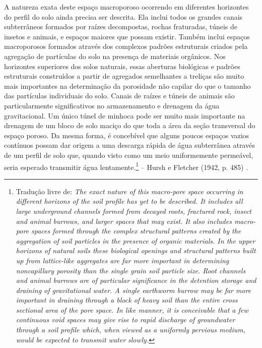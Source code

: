 \documentclass[./main.tex]{subfiles}
\begin{document}
\begin{adjustwidth}{100pt}{0pt}
\medskip
\small A natureza exata deste espaço macroporoso ocorrendo em diferentes horizontes do perfil do solo ainda precisa ser descrita. Ela inclui todos os grandes canais subterrâneos formados por raízes decompostas, rochas fraturadas, túneis de insetos e animais, e espaços maiores que possam existir. Também inclui espaços macroporosos formados através dos complexos padrões estruturais criados pela agregação de partículas do solo na presença de materiais orgânicos. Nos horizontes superiores dos solos naturais, essas aberturas biológicas e padrões estruturais construídos a partir de agregados semelhantes a treliças são muito mais importantes na determinação da porosidade não capilar do que o tamanho das partículas individuais do solo. Canais de raízes e túneis de animais são particularmente significativos no armazenamento e drenagem da água gravitacional. Um único túnel de minhoca pode ser muito mais importante na drenagem de um bloco de solo maciço do que toda a área da seção transversal do espaço poroso. Da mesma forma, é concebível que alguns poucos espaços vazios contínuos possam dar origem a uma descarga rápida de água subterrânea através de um perfil de solo que, quando visto como um meio uniformemente permeável, seria esperado transmitir água lentamente.\footnote{Tradução livre de: \textit{The exact nature of this macro-pore space occurring in different horizons of the soil profile has yet to be described. It includes all large underground channels formed from decayed roots, fractured rock, insect and animal burrows, and larger spaces that may exist. It also includes macro-pore spaces formed through the complex structural patterns created by the aggregation of soil particles in the presence of organic materials. In the upper horizons of natural soils these biological openings and structural patterns built up from lattice-like aggregates are far more important in determining noncapillary porosity than the single grain soil particle size. Root channels and animal burrows are of particular significance in the detention storage and draining of gravitational water. A single earthworm burrow may be far more important in draining through a block of heavy soil than the entire cross sectional area of the pore space. In like manner, it is conceivable that a few continuous void spaces may give rise to rapid discharge of groundwater through a soil profile which, when viewed as a uniformly pervious medium, would be expected to transmit water slowly.}} -- Hursh e Fletcher (1942, p. 485) \cite{Hursh1942}.
\medskip
\end{adjustwidth}
\end{document}
